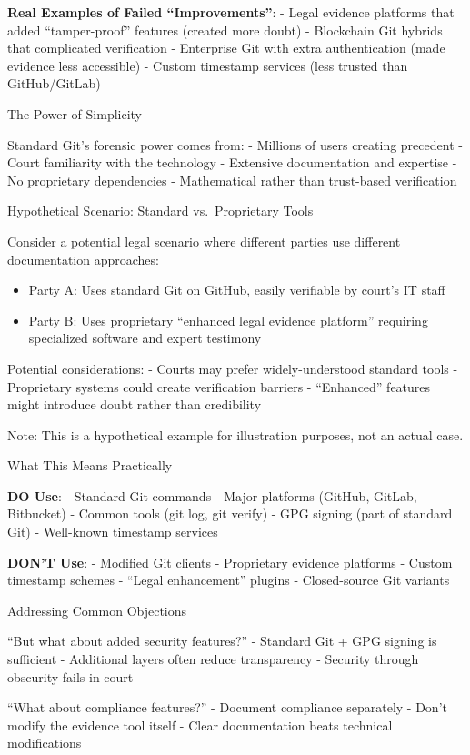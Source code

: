 \textbf{Real Examples of Failed ``Improvements''}: - Legal evidence
platforms that added ``tamper-proof'' features (created more doubt) -
Blockchain Git hybrids that complicated verification - Enterprise Git
with extra authentication (made evidence less accessible) - Custom
timestamp services (less trusted than GitHub/GitLab)

The Power of Simplicity

Standard Git's forensic power comes from: - Millions of users creating
precedent - Court familiarity with the technology - Extensive
documentation and expertise - No proprietary dependencies - Mathematical
rather than trust-based verification

Hypothetical Scenario: Standard vs.~Proprietary Tools

Consider a potential legal scenario where different parties use
different documentation approaches:

\begin{itemize}
\tightlist
\item
  Party A: Uses standard Git on GitHub, easily verifiable by court's IT
  staff
\item
  Party B: Uses proprietary ``enhanced legal evidence platform''
  requiring specialized software and expert testimony
\end{itemize}

Potential considerations: - Courts may prefer widely-understood standard
tools - Proprietary systems could create verification barriers -
``Enhanced'' features might introduce doubt rather than credibility

Note: This is a hypothetical example for illustration purposes, not an
actual case.

What This Means Practically

\textbf{DO Use}: - Standard Git commands - Major platforms (GitHub,
GitLab, Bitbucket) - Common tools (git log, git verify) - GPG signing
(part of standard Git) - Well-known timestamp services

\textbf{DON'T Use}: - Modified Git clients - Proprietary evidence
platforms - Custom timestamp schemes - ``Legal enhancement'' plugins -
Closed-source Git variants

Addressing Common Objections

``But what about added security features?'' - Standard Git + GPG signing
is sufficient - Additional layers often reduce transparency - Security
through obscurity fails in court

``What about compliance features?'' - Document compliance separately -
Don't modify the evidence tool itself - Clear documentation beats
technical modifications

